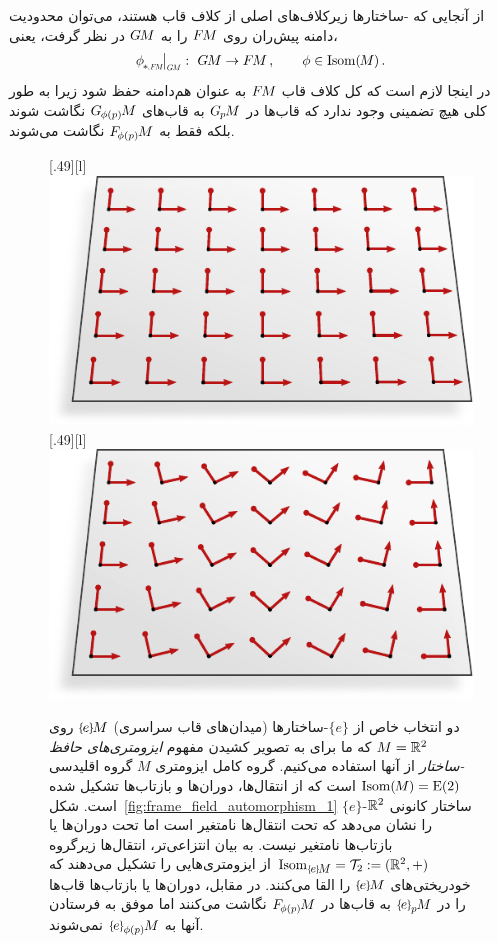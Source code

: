 از آنجایی که -ساختارها زیرکلاف‌های اصلی از کلاف قاب هستند، می‌توان محدودیت دامنه پیش‌ران روی $F\mkern-1.5muM$ را به $G\mkern-1.4muM$ در نظر گرفت، یعنی،
\begin{align}
    \dphiFM \mkern-2mu \big|_{\scalebox{.58}{$\GM$}} :\ \GM \to \FM \,, \qquad \phi\in \IsomM \,.
\end{align}
در اینجا لازم است که کل کلاف قاب $F\mkern-1.5muM$ به عنوان هم‌دامنه حفظ شود زیرا به طور کلی هیچ تضمینی وجود ندارد که قاب‌ها در $G_{\mkern-1.3mu p}\mkern-1.2muM$ به قاب‌های $G_{\mkern-1.5mu \phi(p)}\mkern-1.5muM$ نگاشت شوند بلکه فقط به $F_{\mkern-1.6mu \phi(p)}\mkern-1.3muM$ نگاشت می‌شوند.
\begin{figure}
    \centering
        [.49\linewidth][l]{
            \includegraphics[width=.46\textwidth]{figures/frame_field_isom_equiv_1.pdf}
        }
        [.49\linewidth][l]{
            \includegraphics[width=.46\textwidth]{figures/frame_field_isom_equiv_2.pdf}
        }
    \caption[]{\small
        دو انتخاب خاص از $\{e\}$-ساختارها (میدان‌های قاب سراسری) $\eM$ روی $M = \mathbb{R}^2$ که ما برای به تصویر کشیدن مفهوم \emph{ایزومتری‌های حافظ -ساختار} از آنها استفاده می‌کنیم.
        گروه کامل ایزومتری $M$ گروه اقلیدسی $\operatorname{Isom}(\mkern-1.5mu M \mkern-.5mu)=\operatorname{E}(2)$ است که از انتقال‌ها، دوران‌ها و بازتاب‌ها تشکیل شده است.
        شکل~\ref{fig:frame_field_automorphism_1} $\{e\}$-ساختار کانونی $\mathbb{R}^2$ را نشان می‌دهد که تحت انتقال‌ها نامتغیر است اما تحت دوران‌ها یا بازتاب‌ها نامتغیر نیست.
        به بیان انتزاعی‌تر، انتقال‌ها زیرگروه $\IsomeM = \Trans_2 := (\R^2,+)$ از ایزومتری‌هایی را تشکیل می‌دهند که خودریختی‌های $\eM$ را القا می‌کنند.
        در مقابل، دوران‌ها یا بازتاب‌ها قاب‌ها را در $\epM$ به قاب‌ها در $F_{\mkern-1.6mu \phi(p)}\mkern-1.3muM$ نگاشت می‌کنند اما موفق به فرستادن آنها به $\ephipM$ نمی‌شوند.
}
\end{figure}
